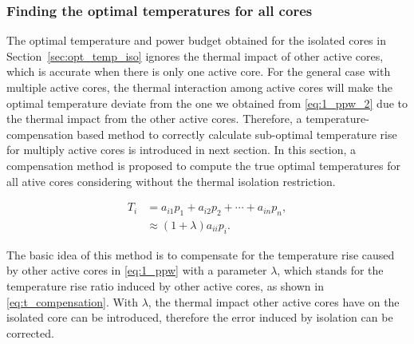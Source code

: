 \subsubsection{Finding the optimal temperatures for all cores}

The optimal temperature and power budget obtained for the
isolated cores in Section~\ref{sec:opt_temp_iso} ignores the thermal impact of other active cores, which
is accurate when there is only one active core. For the general
case with multiple active cores, the thermal interaction among active
cores will make the optimal temperature deviate from the one we
obtained from \eqref{eq:1_ppw_2} due to the thermal impact from the
other active cores. Therefore, a temperature-compensation based method to correctly calculate sub-optimal temperature rise for multiply active cores is introduced in next section.
In this section, a compensation method is proposed to compute the true
optimal temperatures for all ative cores considering without the
thermal isolation restriction.

\begin{equation}\label{eq:t_compensation}
\begin{split}
T_{i} &=a_{i1}p_{1} + a_{i2}p_{2} +\cdots + a_{in}p_{n},\\
&\approx(1+\lambda)a_{ii}p_{i}.
\end{split}
\end{equation}

The basic idea of this method is to compensate for the temperature rise caused by other active cores in \eqref{eq:1_ppw} with a parameter $\lambda$, which stands for the temperature rise ratio induced by other active cores, as shown in \eqref{eq:t_compensation}. With $\lambda$, the thermal impact other active cores have on the isolated core can be introduced, therefore the error induced by isolation can be corrected.

